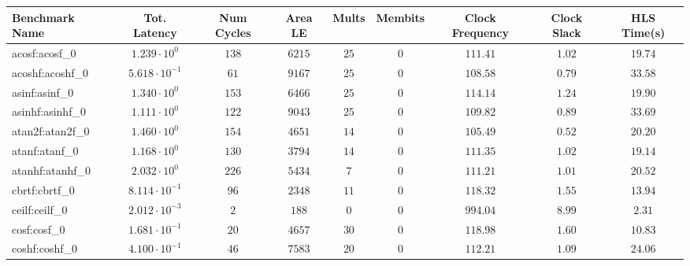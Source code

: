 \begin{tabular}{|l|c|c|c|c|c|c|c|c|}
\hline
Benchmark Name               & Tot. Latency            & Num Cycles & Area LE    & Mults   & Membits & Clock Frequency & Clock Slack & HLS Time(s) \\
\hline
acosf:acosf\_0               & $ 1.239 \cdot 10^{0}  $ & $ 138    $ & $ 6215   $ & $ 25  $ & $ 0   $ & $ 111.41      $ & $ 1.02    $ & $ 19.74   $ \\
acoshf:acoshf\_0             & $ 5.618 \cdot 10^{-1} $ & $ 61     $ & $ 9167   $ & $ 25  $ & $ 0   $ & $ 108.58      $ & $ 0.79    $ & $ 33.58   $ \\
asinf:asinf\_0               & $ 1.340 \cdot 10^{0}  $ & $ 153    $ & $ 6466   $ & $ 25  $ & $ 0   $ & $ 114.14      $ & $ 1.24    $ & $ 19.90   $ \\
asinhf:asinhf\_0             & $ 1.111 \cdot 10^{0}  $ & $ 122    $ & $ 9043   $ & $ 25  $ & $ 0   $ & $ 109.82      $ & $ 0.89    $ & $ 33.69   $ \\
atan2f:atan2f\_0             & $ 1.460 \cdot 10^{0}  $ & $ 154    $ & $ 4651   $ & $ 14  $ & $ 0   $ & $ 105.49      $ & $ 0.52    $ & $ 20.20   $ \\
atanf:atanf\_0               & $ 1.168 \cdot 10^{0}  $ & $ 130    $ & $ 3794   $ & $ 14  $ & $ 0   $ & $ 111.35      $ & $ 1.02    $ & $ 19.14   $ \\
atanhf:atanhf\_0             & $ 2.032 \cdot 10^{0}  $ & $ 226    $ & $ 5434   $ & $ 7   $ & $ 0   $ & $ 111.21      $ & $ 1.01    $ & $ 20.52   $ \\
cbrtf:cbrtf\_0               & $ 8.114 \cdot 10^{-1} $ & $ 96     $ & $ 2348   $ & $ 11  $ & $ 0   $ & $ 118.32      $ & $ 1.55    $ & $ 13.94   $ \\
ceilf:ceilf\_0               & $ 2.012 \cdot 10^{-3} $ & $ 2      $ & $ 188    $ & $ 0   $ & $ 0   $ & $ 994.04      $ & $ 8.99    $ & $ 2.31    $ \\
cosf:cosf\_0                 & $ 1.681 \cdot 10^{-1} $ & $ 20     $ & $ 4657   $ & $ 30  $ & $ 0   $ & $ 118.98      $ & $ 1.60    $ & $ 10.83   $ \\
coshf:coshf\_0               & $ 4.100 \cdot 10^{-1} $ & $ 46     $ & $ 7583   $ & $ 20  $ & $ 0   $ & $ 112.21      $ & $ 1.09    $ & $ 24.06   $ \\

\end{tabular}
